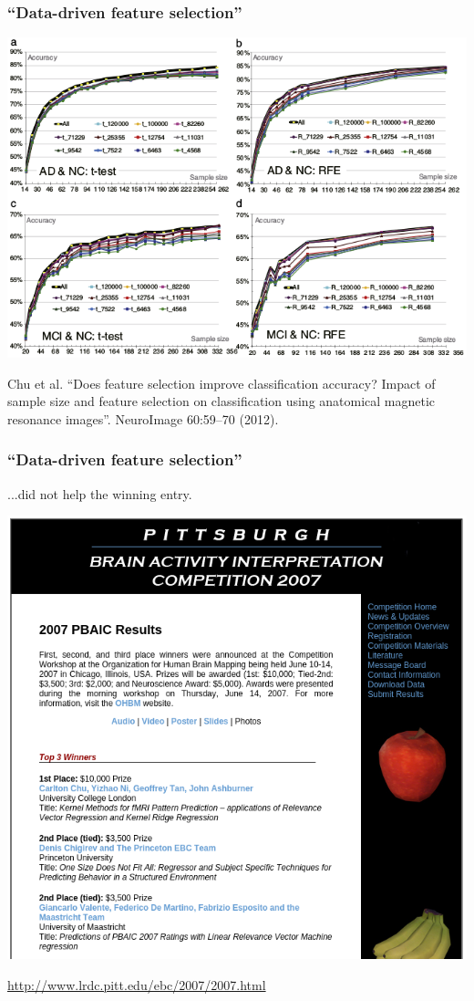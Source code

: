 \begin{frame}
\frametitle{``Data-driven feature selection''}
\begin{center}
\includegraphics[height=0.55\textwidth]{data_driven_feature_selection.png}\par
\begin{tiny}
Chu et al. ``Does feature selection improve classification accuracy? Impact of sample size and feature selection on classification using anatomical magnetic resonance images''.  NeuroImage 60:59--70 (2012).\par
\end{tiny}
\end{center}
\end{frame}




\begin{frame}
\frametitle{``Data-driven feature selection''}
...did not help the winning entry.
\begin{center}
\includegraphics[height=0.5\textwidth]{pbaic2007}\par
\url{http://www.lrdc.pitt.edu/ebc/2007/2007.html}\par
\end{center}
\end{frame}





